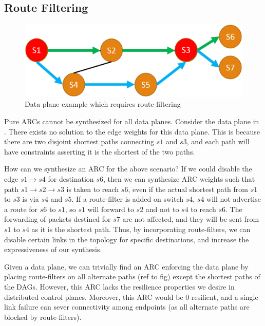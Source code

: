 \subsection{Route Filtering} \label{sec:routefilter}
\begin{figure}[h!] 
	\centering
	\includegraphics[width=\columnwidth]{figures/diamond.eps}
	\caption{Data plane example which requires route-filtering} \label{fig:diamond}
\end{figure}
Pure ARCs cannot be synthesized for all data planes. Consider the data
plane in . 
There exists no solution to the edge weights for this data plane. This is because 
there are two disjoint shortest paths connecting $s1$ and $s3$, and each path will have 
constraints
asserting it is the shortest of the two paths. 

How can we synthesize an ARC for the above scenario? 
If we could disable the edge
$s1 \rightarrow s4$ for destination $s6$, then we can synthesize ARC weights
such that path $s1 \rightarrow s2 \rightarrow s3$ is taken to reach $s6$, 
even if the actual shortest path
from $s1$ to $s3$ is via $s4$ and $s5$. 
If a route-filter is added on switch $s4$, $s4$ 
will not advertise a route for $s6$ to $s1$, so 
$s1$ will forward to $s2$ and not to $s4$
to reach $s6$. The forwarding of packets destined
for $s7$ are not affected, and they will be sent from
$s1$ to $s4$ as it is the shortest path.
Thus, by incorporating route-filters, we can
disable certain links in the topology 
for specific destinations, and increase the 
expressiveness of our synthesis. 

Given a data plane, we can trivially find an 
ARC enforcing the data plane by placing 
route-filters on all alternate paths (ref to fig)
except the shortest paths of the DAGs. However, this
ARC lacks the resilience properties we desire in
distributed control planes. Moreover, this ARC would be
0-resilient, and a single link failure can sever 
connectivity among endpoints (as all alternate paths
are blocked by route-filters). 

